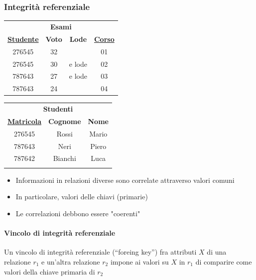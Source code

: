 \documentclass[12pt,a4paper]{article}
\begin{document}
\subsubsection{Integrità referenziale}
\begin{center}
\begin{tabular}{cccc}
\multicolumn{4}{c}{\textbf{Esami}} \\
{\underline{\textbf{Studente}}} & \textbf{Voto} & \textbf{Lode} & {\underline{\textbf{Corso}}} \\ \hline
276545 & 32 & & 01 \\
276545 & 30 & e lode & 02 \\
787643 & 27 & e lode & 03 \\
787643 & 24 &  & 04\\ \hline
\end{tabular} \Sep \Sep
\begin{tabular}{ccc}
\multicolumn{3}{c}{\textbf{Studenti}} \\
\underline{\textbf{Matricola}} & \textbf{Cognome} & \textbf{Nome} \\ \hline
276545 & Rossi & Mario \\
787643 & Neri & Piero \\
787642 & Bianchi & Luca \\ 
 & & \\ \hline
\end{tabular}
\end{center}

\begin{itemize}
\item Informazioni in relazioni diverse sono correlate attraverso valori comuni
\item In particolare, valori delle chiavi (primarie)
\item Le correlazioni debbono essere "coerenti"
\end{itemize}

\paragraph{Vincolo di integrità referenziale\\}
Un vincolo di integrità referenziale (“foreing key”) fra attributi $X$ di una relazione $r_1$ e un’altra relazione $r_2$ impone ai valori su $X$ in $r_1$ di comparire come valori della chiave primaria di $r_2$
\end{document}
